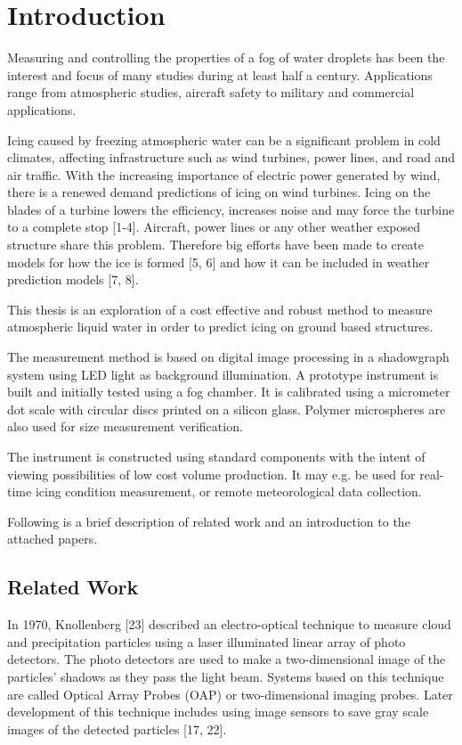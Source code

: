 

\chapter{Introduction}
Measuring and controlling the properties of a fog of water droplets has been the interest and focus of many studies during at least half a century. Applications range from atmospheric studies, aircraft safety to military and commercial applications. 

Icing caused by freezing atmospheric water can be a significant problem in cold climates, affecting infrastructure such as wind turbines, power lines, and road and air traffic. With the increasing importance of electric power generated by wind, there is a renewed demand predictions of icing on wind turbines. Icing on the blades of a turbine lowers the efficiency, increases noise and may force the turbine to a complete stop [1-4]. Aircraft, power lines or any other weather exposed structure share this problem. Therefore big efforts have been made to create models for how the ice is formed [5, 6] and how it can be included in weather prediction models [7, 8].

This thesis is an exploration of a cost effective and robust method to measure atmospheric liquid water in order to predict icing on ground based structures.

The measurement method is based on digital image processing in a shadowgraph system using LED light as background illumination. A prototype instrument is built and initially tested using a fog chamber. It is calibrated using a micrometer dot scale with circular discs printed on a silicon glass. Polymer microspheres are also used for size measurement verification.

The instrument is constructed using standard components with the intent of viewing possibilities of low cost volume production. It may e.g. be used for real-time icing condition measurement, or remote meteorological data collection. 

Following is a brief description of related work and an introduction to the attached papers.

\section{Related Work}

In 1970, Knollenberg [23] described an electro-optical technique to measure cloud and precipitation particles using a laser illuminated linear array of photo detectors. The photo detectors are used to make a two-dimensional image of the particles’ shadows as they pass the light beam. Systems based on this technique are called Optical Array Probes (OAP) or two-dimensional imaging probes. Later development of this technique includes using image sensors to save gray scale images of the detected particles [17, 22].

